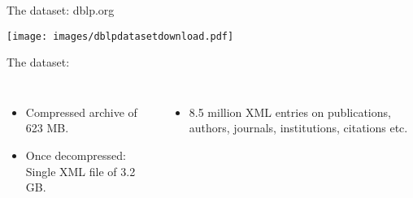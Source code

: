 \documentclass[aspectratio = 169, 15pt, trans]{beamer}
\begin{document}
    \begin{frame}{The dataset: dblp.org}
        \begin{center}
            \vspace*{-0.1cm}
            \texttt{[image: images/dblpdatasetdownload.pdf]}
        \end{center}
        
        \vspace*{-0.3cm}
        {\color{darkgray}The dataset:}
        \begin{columns}[t]
                \vspace*{-0.6cm}
                \begin{itemize}
                	\item Compressed archive of 623 MB.
                	\item Once decompressed: Single XML file of 3.2 GB.
                \end{itemize}
                
                \vspace*{-0.6cm}
                \begin{itemize}
                	\item 8.5 million XML entries on publications, authors, journals, institutions, citations etc.
                \end{itemize}
        \end{columns}
    \end{frame}
    
\end{document}
